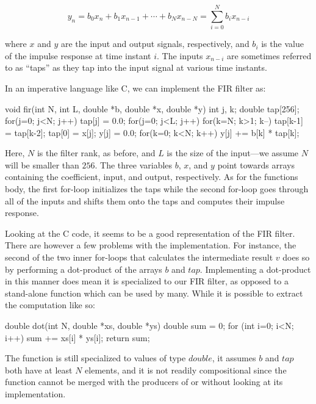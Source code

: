 \documentclass[../main.tex]{subfiles}
\begin{document}
\vspace{-2mm}
\begin{equation}
y_{n} = b_{0} x_{n} + b_{1} x_{n-1} + \cdots + b_{N} x_{n-N} = \sum_{i=0}^{N} b_{i} x_{n-i}
\end{equation}
\vspace{1mm}

\noindent where $x$ and $y$ are the input and output signals, respectively, and $b_i$ is the value of the impulse response at time instant $i$. The inputs $x_{n-i}$ are sometimes referred to as ``taps'' as they tap into the input signal at various time instants. 

In an imperative language like C, we can implement the FIR filter as:

\begin{code}
void fir(int N, int L, double *b, double *x, double *y)
{
 int j, k;
 double tap[256];
 for(j=0; j<N; j++) tap[j] = 0.0;
 for(j=0; j<L; j++)
 {
  for(k=N; k>1; k--) tap[k-1] = tap[k-2];
  tap[0] = x[j];
  y[j] = 0.0;
  for(k=0; k<N; k++) y[j] += b[k] * tap[k];
 }
}
\end{code}

\noindent Here, $N$ is the filter rank, as before, and $L$ is the size of the input---we assume $N$ will be smaller than $256$. The three variables $b$, $x$, and $y$ point towards arrays containing the coefficient, input, and output, respectively. As for the functions body, the first for-loop initializes the taps while the second for-loop goes through all of the inputs and shifts them onto the taps and computes their impulse response.

Looking at the C code, it seems to be a good representation of the FIR filter. There are however a few problems with the implementation. For instance, the second of the two inner for-loops that calculates the intermediate result $v$ does so by performing a dot-product of the arrays $b$ and $tap$. Implementing a dot-product in this manner does mean it is specialized to our FIR filter, as opposed to a stand-alone function which can be used by many. While it is possible to extract the computation like so:

\begin{code}
double dot(int N, double *xs, double *ys)
{
  double sum = 0;
  for (int i=0; i<N; i++) sum += xs[i] * ys[i];
  return sum;
}
\end{code}

\noindent The function is still specialized to values of type $double$, it assumes $b$ and $tap$ both have at least $N$ elements, and it is not readily compositional since the function cannot be merged with the producers of  or  without looking at its implementation.
\end{document}
